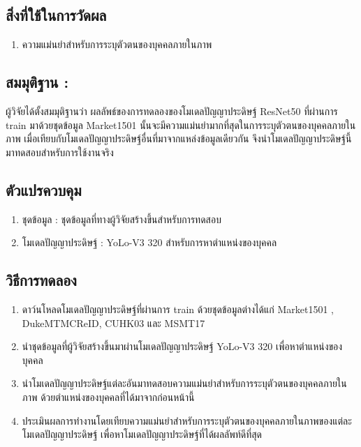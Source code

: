 \subsection*{สิ่งที่ใช้ในการวัดผล}
	\begin{enumerate}
		\item ความแม่นยำสำหรับการระบุตัวตนของบุคคลภายในภาพ
	\end{enumerate}
\subsection*{สมมุติฐาน :}ผู้วิจัยได้ตั้งสมมุติฐานว่า ผลลัพธ์ของการทดลองของโมเดลปัญญาประดิษฐ์ ResNet50 ที่ผ่านการ train มาด้วยชุดข้อมูล Market1501 นั้นจะมีความแม่นยำมากที่สุดในการระบุตัวตนของบุคคลภายในภาพ เมื่อเทียบกับโมเดลปัญญาประดิษฐ์อื่นที่มาจากแหล่งข้อมูลเดียวกัน จึงนำโมเดลปัญญาประดิษฐ์นี้มาทดสอบสำหรับการใช้งานจริง
\subsection*{ตัวแปรควบคุม}
	\begin{enumerate}
		\item ชุดข้อมูล : ชุดข้อมูลที่ทางผู้วิจัยสร้างขึ้นสำหรับการทดสอบ
		\item โมเดลปัญญาประดิษฐ์ : YoLo-V3 320  สำหรับการหาตำแหน่งของบุคคล
	\end{enumerate}
\subsection*{วิธีการทดลอง}
	\begin{enumerate}
		\item ดาว์นโหลดโมเดลปัญญาประดิษฐ์ที่ผ่านการ train ด้วยชุดข้อมูลต่างได้แก่ Market1501 , DukeMTMCReID, CUHK03 และ MSMT17
		\item นำชุดข้อมูลที่ผู้วิจัยสร้างขึ้นมาผ่านโมเดลปัญญาประดิษฐ์ YoLo-V3 320 เพื่อหาตำแหน่งของบุคคล
		\item นำโมเดลปัญญาประดิษฐ์แต่ละอันมาทดสอบความแม่นยำสำหรับการระบุตัวตนของบุคคลภายในภาพ ด้วยตำแหน่งของบุคคลที่ได้มาจากก่อนหน้านี้
		\item ประเมินผลการทำงานโดยเทียบความแม่นยำสำหรับการระบุตัวตนของบุคคลภายในภาพของแต่ละโมเดลปัญญาประดิษฐ์ เพื่อหาโมเดลปัญญาประดิษฐ์ที่ได้ผลลัพท์ดีที่สุด
\end{enumerate}
